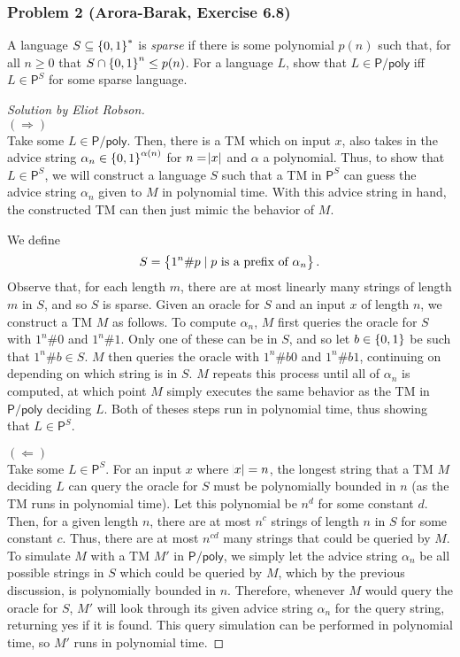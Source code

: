 \documentclass{article}
\newenvironment{solution}[1]{\begin{proof}[Solution by #1]}{\end{proof}}
\newcommand{\Pe}{\mathsf{P}}
\newcommand{\poly}{\mathsf{poly}}
\begin{document}
\subsubsection{Problem 2 (Arora-Barak, Exercise 6.8)}
A language \(S \subseteq \set{0,1}^*\) is \emph{sparse} if there is some polynomial \(p(n)\) such that, for all \(n \geq 0\) that \(S \cap \set{0,1}^n \leq p(n)\). For a language \(L\), show that \(L \in \Pe / \poly\) iff \(L \in \Pe^S\) for some sparse language.

\begin{solution}{Eliot Robson}
    \hfill\\
    \((\Longrightarrow)\)\\
    Take some \(L \in \Pe/\poly\). Then, there is a TM which on input \(x\), also takes in the advice string \(\alpha_n \in \set{0,1}^{\alpha(n)}\) for \(n = \abs{x}\) and \(\alpha\) a polynomial. Thus, to show that \(L \in \Pe^{S}\), we will construct a language \(S\) such that a TM in \(\Pe^{S}\) can guess the advice string \(\alpha_n\) given to \(M\) in polynomial time. With this advice string in hand, the constructed TM can then just mimic the behavior of \(M\).
    
    We define 
    \[
        S = \set{1^n \# p \mid \text{\(p\) is a prefix of \(\alpha_n\)}}.
    \]
    Observe that, for each length \(m\), there are at most linearly many strings of length \(m\) in \(S\), and so \(S\) is sparse. Given an oracle for \(S\) and an input \(x\) of length \(n\), we construct a TM \(M\) as follows. To compute \(\alpha_n\), \(M\) first queries the oracle for \(S\) with \(1^n \# 0\) and \(1^n \# 1\). Only one of these can be in \(S\), and so let \(b \in \set{0,1}\) be such that \(1^n \# b \in S\). \(M\) then queries the oracle with \(1^n \# b 0\) and \(1^n \# b 1\), continuing on depending on which string is in \(S\). \(M\) repeats this process until all of \(\alpha_n\) is computed, at which point \(M\) simply executes the same behavior as the TM in \(\Pe / \poly\) deciding \(L\). Both of theses steps run in polynomial time, thus showing that \(L \in \Pe^{S}\).
    
    \((\Longleftarrow)\)\\
    Take some \(L \in \Pe^{S}\). For an input \(x\) where \(\abs{x} = n\), the longest string that a TM \(M\) deciding \(L\) can query the oracle for \(S\) must be polynomially bounded in \(n\) (as the TM runs in polynomial time). Let this polynomial be \(n^d\) for some constant \(d\). Then, for a given length \(n\), there are at most \(n^c\) strings of length \(n\) in \(S\) for some constant \(c\). Thus, there are at most \(n^{cd}\) many strings that could be queried by \(M\). To simulate \(M\) with a TM \(M'\) in \(\Pe / \poly\), we simply let the advice string \(\alpha_n\) be all possible strings in \(S\) which could be queried by \(M\), which by the previous discussion, is polynomially bounded in \(n\). Therefore, whenever \(M\) would query the oracle for \(S\), \(M'\) will look through its given advice string \(\alpha_n\) for the query string, returning yes if it is found. This query simulation can be performed in polynomial time, so \(M'\) runs in polynomial time.
\end{solution}
\end{document}
